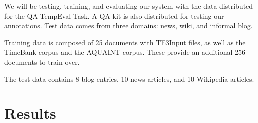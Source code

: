 \documentclass[11pt,letterpaper]{article}
\begin{document}
We will be testing, training, and evaluating our system with the data distributed for the QA TempEval Task. A QA kit is also distributed for testing our annotations. Test data comes from three domains: news, wiki, and informal blog. 

Training data is composed of 25 documents with TE3Input files, as well as the TimeBank corpus and the AQUAINT corpus. These provide an additional 256 documents to train over.

The test data contains 8 blog entries, 10 news articles, and 10 Wikipedia articles.

\section{Results}



%



\end{document}
